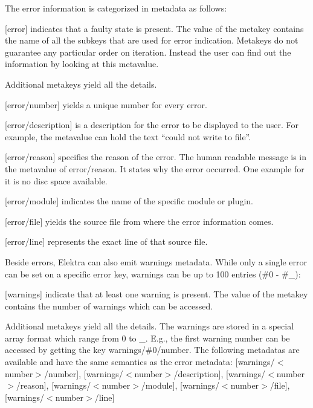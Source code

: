 The error information is categorized in metadata as follows\+:


\begin{DoxyItemize}
\item \mbox{[}error\mbox{]} indicates that a faulty state is present. The value of the metakey contains the name of all the subkeys that are used for error indication. Metakeys do not guarantee any particular order on iteration. Instead the user can find out the information by looking at this metavalue.
\end{DoxyItemize}

Additional metakeys yield all the details.


\begin{DoxyItemize}
\item \mbox{[}error/number\mbox{]} yields a unique number for every error.
\item \mbox{[}error/description\mbox{]} is a description for the error to be displayed to the user. For example, the metavalue can hold the text “could not write to file”.
\item \mbox{[}error/reason\mbox{]} specifies the reason of the error. The human readable message is in the metavalue of {\ttfamily error/reason}. It states why the error occurred. One example for it is \textquotesingle{}\textquotesingle{}no disc space available\textquotesingle{}\textquotesingle{}.
\item \mbox{[}error/module\mbox{]} indicates the name of the specific module or plugin.
\item \mbox{[}error/file\mbox{]} yields the source file from where the error information comes.
\item \mbox{[}error/line\mbox{]} represents the exact line of that source file.
\end{DoxyItemize}

Beside errors, Elektra can also emit warnings metadata. While only a single error can be set on a specific error key, warnings can be up to 100 entries (\#0 -\/ \#\+\_)\+:


\begin{DoxyItemize}
\item \mbox{[}warnings\mbox{]} indicate that at least one warning is present. The value of the metakey contains the number of warnings which can be accessed.
\end{DoxyItemize}

Additional metakeys yield all the details. The warnings are stored in a special array format which range from 0 to \+\_. E.\+g., the first warning number can be accessed by getting the key {\ttfamily warnings/\#0/number}. The following metadatas are available and have the same semantics as the error metadata\+: {\ttfamily \mbox{[}warnings/$<$number$>$/number\mbox{]}}, {\ttfamily \mbox{[}warnings/$<$number$>$/description\mbox{]}}, {\ttfamily \mbox{[}warnings/$<$number$>$/reason\mbox{]}}, {\ttfamily \mbox{[}warnings/$<$number$>$/module\mbox{]}}, {\ttfamily \mbox{[}warnings/$<$number$>$/file\mbox{]}}, {\ttfamily \mbox{[}warnings/$<$number$>$/line\mbox{]}}

